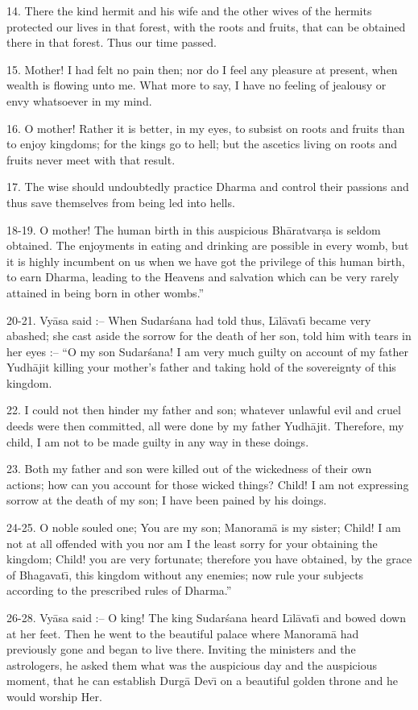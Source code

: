 14. There the kind hermit and his wife and the other wives of the hermits protected our lives in that forest, with the roots and fruits, that can be obtained there in that forest. Thus our time passed.

15. Mother! I had felt no pain then; nor do I feel any pleasure at present, when wealth is flowing unto me. What more to say, I have no feeling of jealousy or envy whatsoever in my mind.

16. O mother! Rather it is better, in my eyes, to subsist on roots and fruits than to enjoy kingdoms; for the kings go to hell; but the ascetics living on roots and fruits never meet with that result.

17. The wise should undoubtedly practice Dharma and control their passions and thus save themselves from being led into hells.

18-19. O mother! The human birth in this auspicious Bh\=aratvar\d{s}a is seldom obtained. The enjoyments in eating and drinking are possible in every womb, but it is highly incumbent on us when we have got the privilege of this human birth, to earn Dharma, leading to the Heavens and salvation which can be very rarely attained in being born in other wombs.''

20-21. Vy\=asa said :-- When Sudar\'sana had told thus, L\={\i}l\=avat\={\i} became very abashed; she cast aside the sorrow for the death of her son, told him with tears in her eyes :-- ``O my son Sudar\'sana! I am very much guilty on account of my father Yudh\=ajit killing your mother's father and taking hold of the sovereignty of this kingdom.

22. I could not then hinder my father and son; whatever unlawful evil and cruel deeds were then committed, all were done by my father Yudh\=ajit. Therefore, my child, I am not to be made guilty in any way in these doings.

23. Both my father and son were killed out of the wickedness of their own actions; how can you account for those wicked things? Child! I am not expressing sorrow at the death of my son; I have been pained by his doings.

24-25. O noble souled one; You are my son; Manoram\=a is my sister; Child! I am not at all offended with you nor am I the least sorry for your obtaining the kingdom; Child! you are very fortunate; therefore you have obtained, by the grace of Bhagavat\={\i}, this kingdom without any enemies; now rule your subjects according to the prescribed rules of Dharma.''

26-28. Vy\=asa said :-- O king! The king Sudar\'sana heard L\={\i}l\=avat\={\i} and bowed down at her feet. Then he went to the beautiful palace where Manoram\=a had previously gone and began to live there. Inviting the ministers and the astrologers, he asked them what was the auspicious day and the auspicious moment, that he can establish Durg\=a Dev\={\i} on a beautiful golden throne and he would worship Her.

